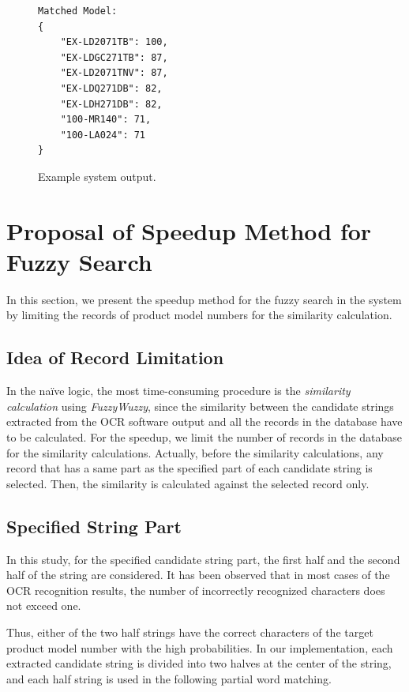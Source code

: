 \documentclass[technicalreport]{ieicej}
\begin{document}
        \begin{figure}[t] 
            \begin{center}
                \begin{BVerbatim}
Matched Model:
{
    "EX-LD2071TB": 100,
    "EX-LDGC271TB": 87,
    "EX-LD2071TNV": 87,
    "EX-LDQ271DB": 82,
    "EX-LDH271DB": 82,
    "100-MR140": 71,
    "100-LA024": 71
}
                \end{BVerbatim}
            \end{center}
            \caption{Example system output.}
            \label{fig:result-sample}
        \end{figure}


\section{Proposal of Speedup Method for Fuzzy Search}
\label{sec:speedup}
    In this section, we present the speedup method for the fuzzy search in the system by limiting the records of product model numbers for the similarity calculation.

    \subsection{Idea of Record Limitation}
        In the naïve logic, the most time-consuming procedure is the {\em similarity calculation} using {\em FuzzyWuzzy}, since the similarity between the candidate strings extracted from the OCR software output and all the records in the database have to be calculated. For the speedup, we limit the number of records in the database for the similarity calculations. Actually, before the similarity calculations, any record that has a same part as the specified part of each candidate string is selected. Then, the similarity is calculated against the selected record only.

    \subsection{Specified String Part}
        In this study, for the specified candidate string part, the first half and the second half of the string are considered. It has been observed that in most cases of the OCR recognition results, the number of incorrectly recognized characters does not exceed one. 
        
        Thus, either of the two half strings have the correct characters of the target product model number with the high probabilities. In our implementation, each extracted candidate string is divided into two halves at the center of the string, and each half string is used in the following partial word matching.
\end{document}
